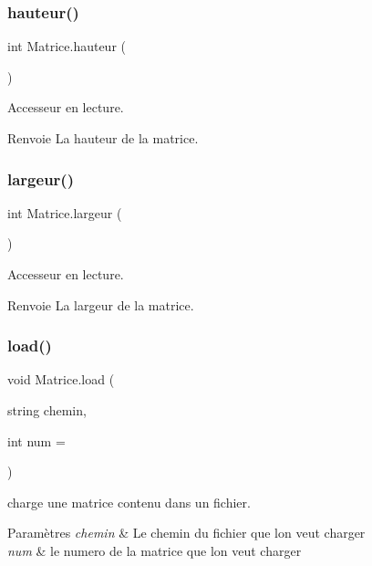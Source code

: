 \subsubsection{\texorpdfstring{hauteur()}{hauteur()}}
{\footnotesize\ttfamily int Matrice.\+hauteur (\begin{DoxyParamCaption}{ }\end{DoxyParamCaption})}



Accesseur en lecture. 

\begin{DoxyReturn}{Renvoie}
La hauteur de la matrice. 
\end{DoxyReturn}
\mbox{\label{class_matrice_a01649b7f1fb32a6a8561c308a22bd22f}} 
\subsubsection{\texorpdfstring{largeur()}{largeur()}}
{\footnotesize\ttfamily int Matrice.\+largeur (\begin{DoxyParamCaption}{ }\end{DoxyParamCaption})}



Accesseur en lecture. 

\begin{DoxyReturn}{Renvoie}
La largeur de la matrice. 
\end{DoxyReturn}
\mbox{\label{class_matrice_aee7c3766d6b49ea2cd8b7dd0eb2cfa81}} 
\subsubsection{\texorpdfstring{load()}{load()}}
{\footnotesize\ttfamily void Matrice.\+load (\begin{DoxyParamCaption}\item[{string}]{chemin,  }\item[{int}]{num = {} }\end{DoxyParamCaption})}



charge une matrice contenu dans un fichier. 


\begin{DoxyParams}{Paramètres}
{\em chemin} & Le chemin du fichier que l\textquotesingle{}on veut charger \\
\hline
{\em num} & le numero de la matrice que l\textquotesingle{}on veut charger \\
\hline
\end{DoxyParams}
\mbox{\label{class_matrice_ad56071409baa0132735123049f27554f}} 
